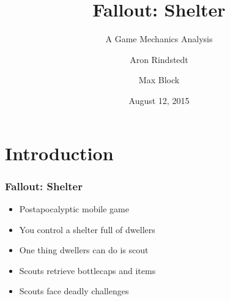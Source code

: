 \documentclass{beamer}
\title{Fallout: Shelter}
\subtitle{A Game Mechanics Analysis}
\author{Aron Rindstedt \and Max Block}
\date{August 12, 2015}
\begin{document}
\maketitle

\section{Introduction}
\begin{frame}
  \frametitle{Fallout: Shelter}
  \begin{itemize}
  \item Postapocalyptic mobile game
  \item You control a shelter full of dwellers
  \item One thing dwellers can do is scout
  \item Scouts retrieve bottlecaps and items
  \item Scouts face deadly challenges
  \end{itemize}
\end{frame}
\end{document}
